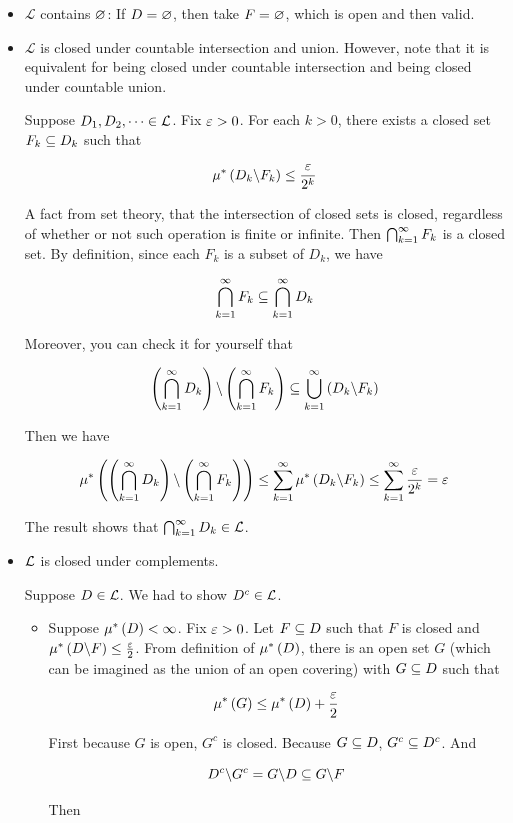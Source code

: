 \documentclass[
]{article}
\begin{document}
\begin{itemize}
\item
  \(\mathcal L\) contains \(\varnothing\): If \(D = \varnothing\), then take
  \(F = \varnothing\), which is open and then valid.
\item
  \(\mathcal L\) is closed under countable intersection and union.
  However, note that it is equivalent for being closed under countable
  intersection and being closed under countable union.

  Suppose \(D_1,D_2,\cdots \in \mathcal L\). Fix \(\varepsilon>0\). For each \(k>0\),
  there exists a closed set \(F_k\subseteq D_k\) such that

  \[\mu^*\left(D_k\backslash F_k\right)\le \frac{\varepsilon}{2^k}\]

  A fact from set theory, that the intersection of closed sets is
  closed, regardless of whether or not such operation is finite or
  infinite. Then \(\bigcap_{{k} = 1}^{\infty} F_k\) is a closed set. By definition, since
  each \(F_k\) is a subset of \(D_k\), we have

  \[\begin{aligned}
  \bigcap_{{k} = 1}^{\infty} F_k\subseteq \bigcap_{{k} = 1}^{\infty} D_k\\
  \end{aligned}\]

  Moreover, you can check it for yourself that

  \[\left(\bigcap_{{k} = 1}^{\infty} D_k\right)\backslash \left(\bigcap_{{k} = 1}^{\infty} F_k\right)\subseteq \bigcup_{{k} = 1}^{\infty} \left(D_k\backslash F_k\right)\]

  Then we have

  \[\mu^*\left(\left(\bigcap_{{k} = 1}^{\infty} D_k\right)\backslash \left(\bigcap_{{k} = 1}^{\infty} F_k\right)\right)\le \sum_{{k} = 1}^{\infty} \mu^*\left(D_k\backslash F_k\right)\le \sum_{{k} = 1}^{\infty} \frac{\varepsilon}{2^k} = \varepsilon\]

  The result shows that \(\bigcap_{{k} = 1}^{\infty} D_k\in \mathcal L\).
\item
  \(\mathcal L\) is closed under complements.

  Suppose \(D\in \mathcal L\). We had to show \(D^c\in \mathcal L\).

  \begin{itemize}
  \item
    Suppose \(\mu^*\left(D\right)<\infty\). Fix \(\varepsilon>0\). Let \(F\subseteq D\) such
    that \(F\) is closed and \(\mu^*\left(D\backslash F\right)\le\frac{\varepsilon}2\). From
    definition of \(\mu^*\left(D\right)\), there is an open set \(G\) (which can
    be imagined as the union of an open covering) with \(G\subseteq D\) such
    that

    \[\mu^*\left(G\right)\le \mu^*\left(D\right)+\frac{\varepsilon}2\]

    First because \(G\) is open, \(G^c\) is closed. Because \(G\subseteq D\),
    \(G^c\subseteq D^c\). And

    \[D^c\backslash G^c = G\backslash D\subseteq G\backslash F\]

    Then


\end{itemize}
\end{itemize}
\end{document}
